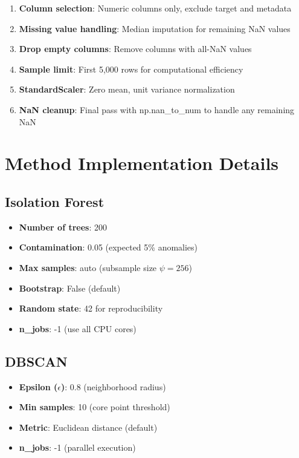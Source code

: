 \documentclass[12pt,a4paper]{report}
\begin{document}
\begin{enumerate}
    \item \textbf{Column selection}: Numeric columns only, exclude target and metadata
    \item \textbf{Missing value handling}: Median imputation for remaining NaN values
    \item \textbf{Drop empty columns}: Remove columns with all-NaN values
    \item \textbf{Sample limit}: First 5,000 rows for computational efficiency
    \item \textbf{StandardScaler}: Zero mean, unit variance normalization
    \item \textbf{NaN cleanup}: Final pass with np.nan\_to\_num to handle any remaining NaN
\end{enumerate}

\section{Method Implementation Details}

\subsection{Isolation Forest}

\begin{itemize}
    \item \textbf{Number of trees}: 200
    \item \textbf{Contamination}: 0.05 (expected 5\% anomalies)
    \item \textbf{Max samples}: auto (subsample size $\psi = 256$)
    \item \textbf{Bootstrap}: False (default)
    \item \textbf{Random state}: 42 for reproducibility
    \item \textbf{n\_jobs}: -1 (use all CPU cores)
\end{itemize}

\subsection{DBSCAN}

\begin{itemize}
    \item \textbf{Epsilon ($\epsilon$)}: 0.8 (neighborhood radius)
    \item \textbf{Min samples}: 10 (core point threshold)
    \item \textbf{Metric}: Euclidean distance (default)
    \item \textbf{n\_jobs}: -1 (parallel execution)
\end{itemize}
\end{document}
